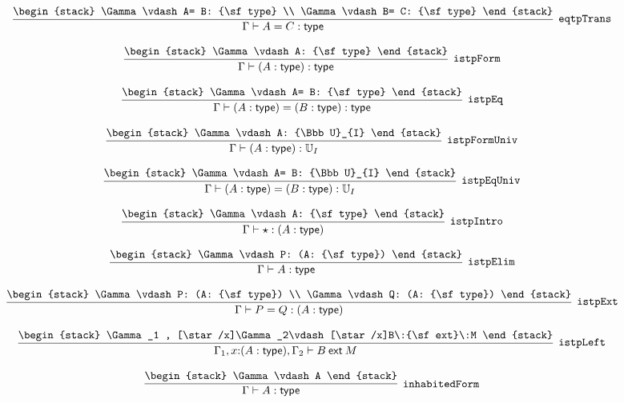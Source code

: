 \[
\infer[{\tt eqtpTrans}]{\Gamma \vdash A= C: {\sf type}}{
\begin{stack}
\Gamma \vdash A= B: {\sf type}
\\
\Gamma \vdash B= C: {\sf type}
\end{stack}}
\]

\[
\infer[{\tt istpForm}]{\Gamma \vdash (A: {\sf type}): {\sf type}}{
\begin{stack}
\Gamma \vdash A: {\sf type}
\end{stack}}
\]

\[
\infer[{\tt istpEq}]{\Gamma \vdash (A: {\sf type})= (B: {\sf type}): {\sf type}}{
\begin{stack}
\Gamma \vdash A= B: {\sf type}
\end{stack}}
\]

\[
\infer[{\tt istpFormUniv}]{\Gamma \vdash (A: {\sf type}): {\Bbb U}_{I}}{
\begin{stack}
\Gamma \vdash A: {\Bbb U}_{I}
\end{stack}}
\]

\[
\infer[{\tt istpEqUniv}]{\Gamma \vdash (A: {\sf type})= (B: {\sf type}): {\Bbb U}_{I}}{
\begin{stack}
\Gamma \vdash A= B: {\Bbb U}_{I}
\end{stack}}
\]

\[
\infer[{\tt istpIntro}]{\Gamma \vdash \star : (A: {\sf type})}{
\begin{stack}
\Gamma \vdash A: {\sf type}
\end{stack}}
\]

\[
\infer[{\tt istpElim}]{\Gamma \vdash A: {\sf type}}{
\begin{stack}
\Gamma \vdash P: (A: {\sf type})
\end{stack}}
\]

\[
\infer[{\tt istpExt}]{\Gamma \vdash P= Q: (A: {\sf type})}{
\begin{stack}
\Gamma \vdash P: (A: {\sf type})
\\
\Gamma \vdash Q: (A: {\sf type})
\end{stack}}
\]

\[
\infer[{\tt istpLeft}]{\Gamma_1 ,x\mathord{:}(A: {\sf type}), \Gamma_2 \vdash B\:{\sf ext}\:M}{
\begin{stack}
\Gamma_1 , [\star /x]\Gamma_2\vdash [\star /x]B\:{\sf ext}\:M
\end{stack}}
\]

\[
\infer[{\tt inhabitedForm}]{\Gamma \vdash A: {\sf type}}{
\begin{stack}
\Gamma \vdash A
\end{stack}}
\]

